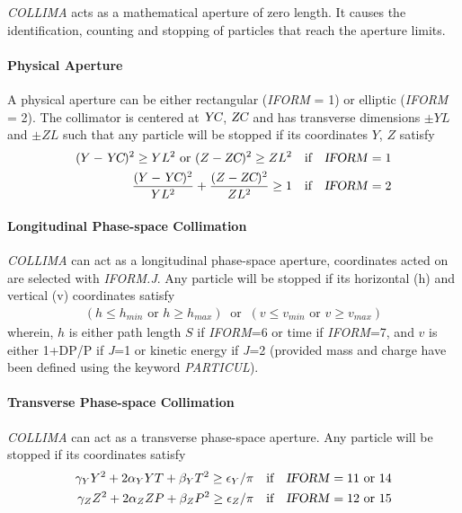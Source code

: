 {\textsl{COLLIMA}  acts as a mathematical aperture of zero length.  It causes 
the identification, counting and stopping of particles that reach the aperture limits.  

\paragraph{Physical Aperture}

\noindent A physical aperture can be either rectangular (\textsl{IFORM} = 1) or elliptic 
(\textsl{IFORM} = 2).  The collimator is centered at $ \textsl{YC}$, $\textsl{ZC} $ and has transverse
dimensions $\pm YL $ and $\pm ZL $ such that any particle will be
stopped if its coordinates $Y$, $Z $ satisfy
\begin{align*}
	(Y-\textsl{YC})^2\geq  YL^2  \text{ or }   (Z-\textsl{ZC})^2 \geq  ZL^2 
	   &   \quad \text{if}\quad  \text{\textsl{IFORM}}=1  \\
	\dfrac{ (Y-\textsl{YC})^2 }{ YL^2} + \dfrac{(Z-\textsl{ZC})^2 }{ ZL^2} \geq 1  
	  &   \quad \text{if}\quad  \text{\textsl{IFORM}}=2  
\end{align*}

\paragraph{Longitudinal Phase-space Collimation} 

\noindent \textsl{COLLIMA}  can act as a longitudinal phase-space aperture, coordinates acted on are 
selected with  \textsl{IFORM.J}. 
Any particle will be stopped  if its horizontal  (h) and vertical (v) coordinates satisfy 
\begin{align*}
	 (h \leq h_{min} \textrm{~or~} h \geq  h_{max})  ~\textrm{~or~}~  (v \leq v_{min}  \textrm{~or~}  v \geq  v_{max})
\end{align*}
wherein, $h$ is either path length $S$ if \textsl{IFORM}=6 or time  if \textsl{IFORM}=7, and 
$v$  is either 1+DP/P if \textsl{J}=1 or kinetic energy  if \textsl{J}=2 (provided mass and charge have 
been defined using the keyword \textsl{PARTICUL}). 




\paragraph{Transverse Phase-space Collimation}

\noindent \textsl{COLLIMA}  can act as a transverse phase-space aperture. 
Any particle will be stopped if its coordinates satisfy 
\begin{align*}
	\gamma_Y Y^2 + 2\alpha_Y Y T + \beta_Y T^2 \geq  \epsilon_Y/\pi 
	   &   \quad \text{if}\quad  \text{\textsl{IFORM}}=11  \text{ or 14} \\
	\gamma_Z Z^2 + 2\alpha_Z Z P + \beta_Z P^2 \geq  \epsilon_Z/\pi 
	   &   \quad \text{if}\quad  \text{\textsl{IFORM}}=12  \text{ or 15}
\end{align*}

}
